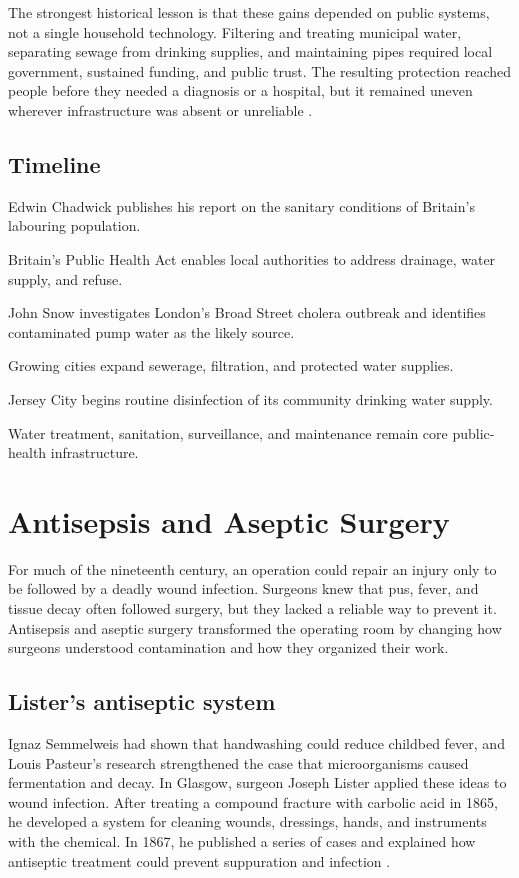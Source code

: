 \documentclass[12pt,oneside]{book}
\begin{document}
The strongest historical lesson is that these gains depended on public
systems, not a single household technology. Filtering and treating municipal
water, separating sewage from drinking supplies, and maintaining pipes
required local government, sustained funding, and public trust. The resulting
protection reached people before they needed a diagnosis or a hospital, but it
remained uneven wherever infrastructure was absent or unreliable
\cite{epaWaterHistory,whoDrinkingWater}.

\section*{Timeline}
\begin{description}[leftmargin=2.3cm,style=nextline]
  \item[1842] Edwin Chadwick publishes his report on the sanitary conditions of Britain's labouring population.
  \item[1848] Britain's Public Health Act enables local authorities to address drainage, water supply, and refuse.
  \item[1854] John Snow investigates London's Broad Street cholera outbreak and identifies contaminated pump water as the likely source.
  \item[Late nineteenth century] Growing cities expand sewerage, filtration, and protected water supplies.
  \item[1908] Jersey City begins routine disinfection of its community drinking water supply.
  \item[Today] Water treatment, sanitation, surveillance, and maintenance remain core public-health infrastructure.
\end{description}
\chapter[Antisepsis and Aseptic Surgery]{Antisepsis and Aseptic Surgery}

For much of the nineteenth century, an operation could repair an injury
only to be followed by a deadly wound infection. Surgeons knew that pus,
fever, and tissue decay often followed surgery, but they lacked a reliable
way to prevent it. Antisepsis and aseptic surgery transformed the operating
room by changing how surgeons understood contamination and how they
organized their work.

\section{Lister's antiseptic system}
Ignaz Semmelweis had shown that handwashing could reduce childbed fever, and
Louis Pasteur's research strengthened the case that microorganisms caused
fermentation and decay. In Glasgow, surgeon Joseph Lister applied these
ideas to wound infection. After treating a compound fracture with carbolic
acid in 1865, he developed a system for cleaning wounds, dressings, hands,
and instruments with the chemical. In 1867, he published a series of cases
and explained how antiseptic treatment could prevent suppuration and
infection \cite{sciencehistorysemmelweis,lister1867,worboysLister}.
\end{document}
